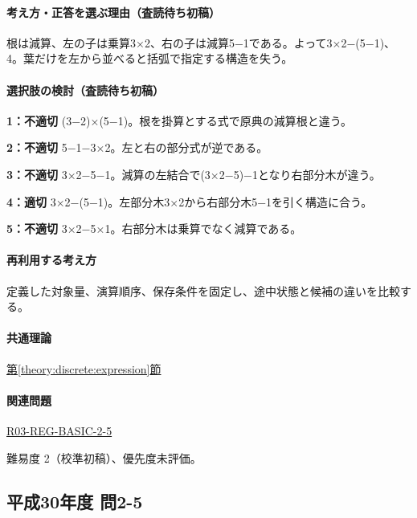 \paragraph{考え方・正答を選ぶ理由（査読待ち初稿）} 根は減算、左の子は乗算3×2、右の子は減算5−1である。よって3×2−(5−1)、4。葉だけを左から並べると括弧で指定する構造を失う。

\paragraph{選択肢の検討（査読待ち初稿）}\mbox{}\par

\noindent\textbf{1：不適切} (3−2)×(5−1)。根を掛算とする式で原典の減算根と違う。\par

\noindent\textbf{2：不適切} 5−1−3×2。左と右の部分式が逆である。\par

\noindent\textbf{3：不適切} 3×2−5−1。減算の左結合で(3×2−5)−1となり右部分木が違う。\par

\noindent\textbf{4：適切} 3×2−(5−1)。左部分木3×2から右部分木5−1を引く構造に合う。\par

\noindent\textbf{5：不適切} 3×2−5×1。右部分木は乗算でなく減算である。\par

\paragraph{再利用する考え方} 定義した対象量、演算順序、保存条件を固定し、途中状態と候補の違いを比較する。

\paragraph{共通理論} \hyperref[theory:discrete:expression]{第\ref*{theory:discrete:expression}節}

\paragraph{関連問題} \hyperref[q:r03-reg-basic-2-5]{R03-REG-BASIC-2-5}

\par 難易度 2（校準初稿）、優先度未評価。

\subsection{平成30年度 問2-5}
\label{q:h30-reg-basic-2-5}

